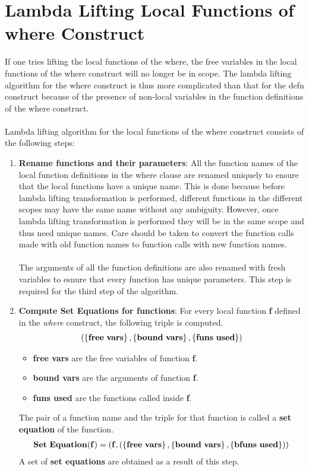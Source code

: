 \documentclass[11pt]{article}
\begin{document}
\section {Lambda Lifting Local Functions of where Construct}\label{lam:algWhere}
If one tries lifting the local functions of the {\sf where}, the free variables in the local functions of the {\sf where} construct will no longer be in scope. The lambda lifting algorithm for the {\sf where} construct is thus more complicated than that for the {\sf defn} construct because of the presence of non-local variables in the function definitions of the {\sf where} construct.
~~\\~~\\ 
Lambda lifting algorithm for the local functions of the {\sf where} construct consists of the following steps:
\begin{enumerate}
    \item {\bf Rename functions and their parameters}: 
    All the function names of the local function definitions in the {\sf where} clause are renamed uniquely to ensure that the local functions have a unique name. This is done because before lambda lifting transformation is performed, different functions in the different scopes may have the same name without any ambiguity. However, once lambda lifting transformation is performed they will be in the same scope and thus need unique names. Care should be taken to convert the function calls made with old function names to function calls with new function names.
    ~~\\~~\\ 
    The arguments of all the function definitions are also renamed with fresh variables to esnure that every function has unique parameters. This step is required for the third step of the algorithm.
    \item {\bf Compute Set Equations for functions}:
    For every local function {\bf f} defined in the {\em where} construct, the following triple is computed.
    \begin{align*}
    {\bf (\left\{free~vars\right\},\left\{bound~vars\right\},\left\{funs~used\right\})}
    \end{align*}
    \begin{itemize}
        \item {\bf free vars} are the free variables of function {\bf f}.
        \item {\bf bound vars} are the arguments of function {\bf f}. 
        \item {\bf funs used}  are the functions called inside {\bf f}.
    \end{itemize}
    The pair of a function name and the triple for that function is called a {\bf set equation} of the function.
    \begin{align*}
        {\bf Set~Equation (f) = (f,(\left\{free~vars\right\},\left\{bound~vars\right\},\left\{bfuns~used\right\}))}
    \end{align*}
    A set of {\bf set equations} are obtained as a result of this step. 
    

\end{enumerate}
\end{document}
